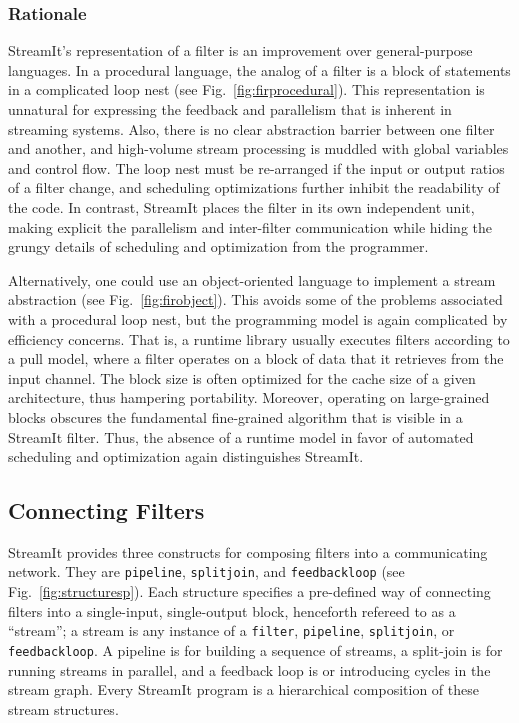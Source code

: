 \documentclass[final]{ijpp}
\begin{document}
\subsubsection{Rationale}  
StreamIt's  representation   of  a  filter  is   an  improvement  over
general-purpose languages.  In a  procedural language, the analog of a
filter  is a  block  of statements  in  a complicated  loop nest  (see
Fig.~\ref{fig:firprocedural}).  This representation is unnatural for
expressing the feedback and  parallelism that is inherent in streaming
systems.   Also, there  is no  clear abstraction  barrier  between one
filter and another, and  high-volume stream processing is muddled with
global variables and control flow.   The loop nest must be re-arranged
if  the input  or output  ratios of  a filter  change,  and scheduling
optimizations  further  inhibit  the  readability  of  the  code.   In
contrast,  StreamIt places  the filter  in its  own  independent unit,
making explicit  the parallelism and  inter-filter communication while
hiding  the grungy  details of  scheduling and  optimization  from the
programmer.

Alternatively, one could use  an object-oriented language to implement
a  stream abstraction  (see Fig.~\ref{fig:firobject}).   This avoids
some of the  problems associated with a procedural  loop nest, but the
programming model  is again complicated by  efficiency concerns.  That
is, a  runtime library  usually executes filters  according to  a pull
model, where  a filter operates on  a block of data  that it retrieves
from the  input channel.   The block size  is often optimized  for the
cache  size  of  a  given architecture,  thus  hampering  portability.
Moreover, operating  on large-grained blocks  obscures the fundamental
fine-grained algorithm  that is visible  in a StreamIt  filter.  Thus,
the absence  of a runtime model  in favor of  automated scheduling and
optimization again distinguishes StreamIt.

\subsection{Connecting Filters}
\label{sec:connecting}

StreamIt  provides  three  constructs  for composing  filters  into  a
communicating network. They are \texttt{pipeline}, \texttt{splitjoin},
and  \texttt{feedbackloop}  (see Fig.~\ref{fig:structuresp}).   Each
structure  specifies a pre-defined  way of  connecting filters  into a
single-input,  single-output  block,   henceforth  refereed  to  as  a
``stream'';   a  stream   is  any   instance  of   a  \texttt{filter},
\texttt{pipeline},  \texttt{splitjoin},  or \texttt{feedbackloop}.   A
pipeline is  for building a sequence  of streams, a  split-join is for
running streams  in parallel,  and a feedback  loop is  or introducing
cycles in the stream graph.   Every StreamIt program is a hierarchical
composition of these stream structures.
\end{document}
